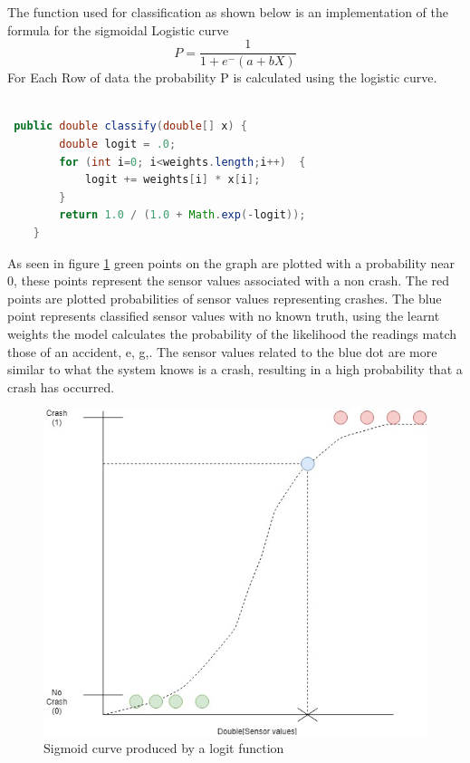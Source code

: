 \vspace{2cm}

The function used for classification as shown below is an implementation of the formula for the sigmoidal Logistic curve  \[
    P = \frac{1}{1+e^ -(a+bX)}
\]   For Each Row of data the probability P is calculated using the logistic curve.


\begin{lstlisting}[language=Java,basicstyle=\small, breaklines=true, label={lst:labell},caption={Classify Function}]

 public double classify(double[] x) {
        double logit = .0;
        for (int i=0; i<weights.length;i++)  {
            logit += weights[i] * x[i];
        }
        return 1.0 / (1.0 + Math.exp(-logit));
    }
\end{lstlisting}





As seen in figure \ref{logit} green points on the graph are plotted with a probability near 0, these points represent the sensor values associated with a non crash. The red points are plotted probabilities of sensor values representing crashes. The blue point represents classified sensor values with no known truth, using the learnt weights the model calculates the probability of the likelihood the readings match those of an accident, e, g,. The sensor values related to the blue dot are more similar to what the system knows is a crash, resulting in a high probability that a crash has occurred. 






\begin{figure}[h]
      \centering
      \includegraphics[scale = .6]{implementation/logit.jpg}
      \caption{Sigmoid curve produced by a logit function}
      \label{logit}
\end{figure}


